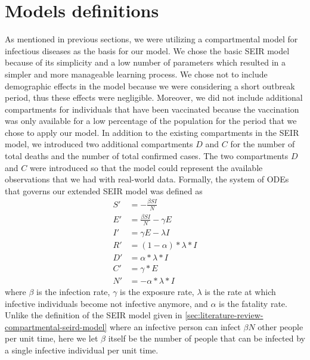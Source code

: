 \section{Models definitions}
\label{sec:methodologies-models-definitions}

As mentioned in previous sections, we were utilizing a compartmental model for infectious diseases as the basis for our model.
We chose the basic \gls{SEIR} model because of its simplicity and a low number of parameters which resulted in a simpler and more manageable learning process.
We chose not to include demographic effects in the model because we were considering a short outbreak period, thus these effects were negligible.
Moreover, we did not include additional compartments for individuals that have been vaccinated because the vaccination was only available for a low percentage of the population for the period that we chose to apply our model.
In addition to the existing compartments in the \gls{SEIR} model, we introduced two additional compartments $D$ and $C$ for the number of total deaths and the number of total confirmed cases.
The two compartments $D$ and $C$ were introduced so that the model could represent the available observations that we had with real-world data.
Formally, the system of \glspl{ODE} that governs our extended \gls{SEIR} model was defined as
\begin{equation}
    \begin{aligned}
        S' &= - \frac{\beta SI}{N} \\
        E' &= \frac{\beta SI}{N} - \gamma E \\
        I' &= \gamma E - \lambda I \\
        R' &= (1 - \alpha) * \lambda * I \\
        D' &= \alpha * \lambda * I \\
        C' &= \gamma * E \\
        N' &= - \alpha * \lambda * I
    \end{aligned}
    \label{eq:methodologies-seir-model}
\end{equation}
where $\beta$ is the infection rate, $\gamma$ is the exposure rate, $\lambda$ is the rate at which infective individuals become not infective anymore, and $\alpha$ is the fatality rate.
Unlike the definition of the \gls{SEIR} model given in \autoref{sec:literature-review-compartmental-seird-model} where an infective person can infect $\beta N$ other people per unit time, here we let $\beta$ itself be the number of people that can be infected by a single infective individual per unit time.
